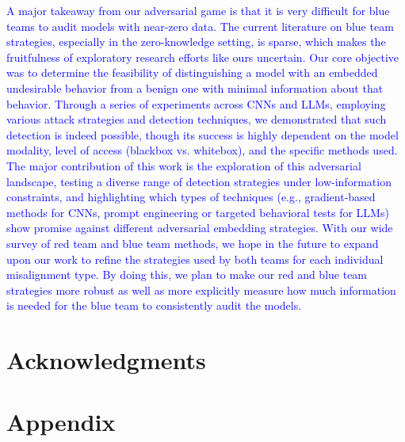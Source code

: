 \documentclass[letterpaper]{article} %
\begin{document}
\textcolor{blue}{
A major takeaway from our adversarial game is that it is very difficult for blue teams to audit models with near-zero data. The current literature on blue team strategies, especially in the zero-knowledge setting, is sparse, which makes the fruitfulness of exploratory research efforts like ours uncertain. 
Our core objective was to determine the feasibility of distinguishing a model with an embedded undesirable behavior from a benign one with minimal information about that behavior. Through a series of experiments across CNNs and LLMs, employing various attack strategies and detection techniques, we demonstrated that such detection is indeed possible, though its success is highly dependent on the model modality, level of access (blackbox vs. whitebox), and the specific methods used. The major contribution of this work is the exploration of this adversarial landscape, testing a diverse range of detection strategies under low-information constraints, and highlighting which types of techniques (e.g., gradient-based methods for CNNs, prompt engineering or targeted behavioral tests for LLMs) show promise against different adversarial embedding strategies.
With our wide survey of red team and blue team methods, we hope in the future to expand upon our work to refine the strategies used by both teams for each individual misalignment type. By doing this, we plan to make our red and blue team strategies more robust as well as more explicitly measure how much information is needed for the blue team to consistently audit the models.
}

\section{Acknowledgments}

\section{Appendix}


\end{document}

